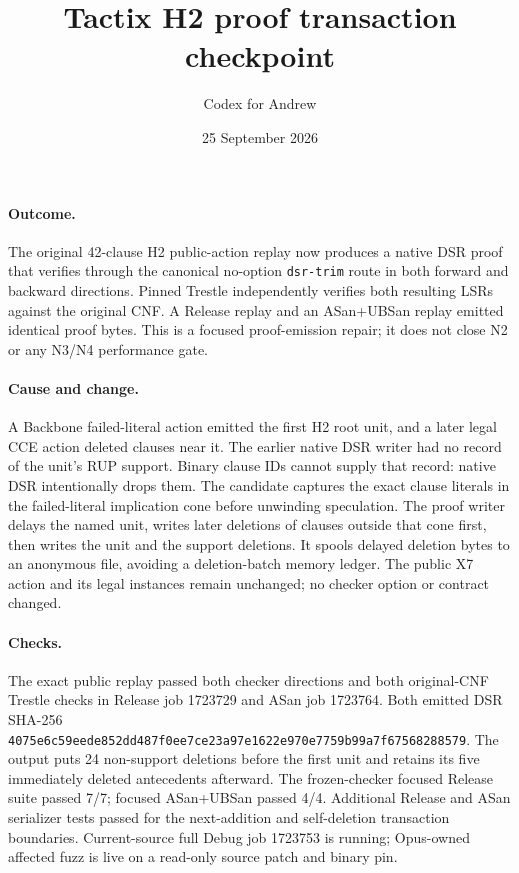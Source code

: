 \documentclass[11pt]{article}
\title{Tactix H2 proof transaction checkpoint}
\author{Codex for Andrew}
\date{25 September 2026}
\begin{document}
\maketitle

\paragraph{Outcome.}
The original 42-clause H2 public-action replay now produces a native DSR proof
that verifies through the canonical no-option \texttt{dsr-trim} route in both
forward and backward directions. Pinned Trestle independently verifies both
resulting LSRs against the original CNF. A Release replay and an ASan+UBSan
replay emitted identical proof bytes. This is a focused proof-emission repair;
it does not close N2 or any N3/N4 performance gate.

\paragraph{Cause and change.}
A Backbone failed-literal action emitted the first H2 root unit, and a later
legal CCE action deleted clauses near it. The earlier native DSR writer had no
record of the unit's RUP support. Binary clause IDs cannot supply that record:
native DSR intentionally drops them. The candidate captures the exact clause
literals in the failed-literal implication cone before unwinding speculation.
The proof writer delays the named unit, writes later deletions of clauses
outside that cone first, then writes the unit and the support deletions. It
spools delayed deletion bytes to an anonymous file, avoiding a deletion-batch
memory ledger. The public X7 action and its legal instances remain unchanged;
no checker option or contract changed.

\paragraph{Checks.}
The exact public replay passed both checker directions and both original-CNF
Trestle checks in Release job 1723729 and ASan job 1723764. Both emitted DSR
SHA-256 \texttt{4075e6c59eede852dd487f0ee7ce23a97e1622e970e7759b99a7f67568288579}.
The output puts 24 non-support deletions before the first unit and retains its
five immediately deleted antecedents afterward. The frozen-checker focused
Release suite passed 7/7; focused ASan+UBSan passed 4/4. Additional Release and
ASan serializer tests passed for the next-addition and self-deletion
transaction boundaries. Current-source full Debug job 1723753 is running;
Opus-owned affected fuzz is live on a read-only source patch and binary pin.
\end{document}
